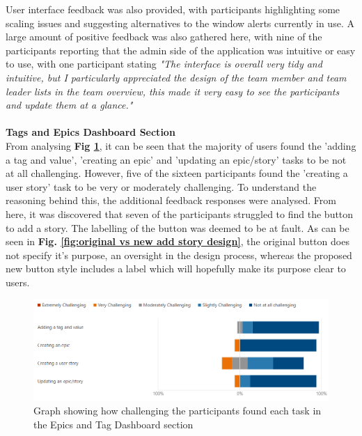 \documentclass[l4proj.tex]{subfiles}
\begin{document}
User interface feedback was also provided, with participants highlighting some scaling issues and suggesting alternatives to the window alerts currently in use. A large amount of positive feedback was also gathered here, with nine of the participants reporting that the admin side of the application was intuitive or easy to use, with one participant stating \textit{"The interface is overall very tidy and intuitive, but I particularly appreciated the design of the team member and team leader lists in the team overview, this made it very easy to see the participants and update them at a glance."} \\
\\
\textbf{Tags and Epics Dashboard Section}\\
From analysing \textbf{Fig \ref{fig:epic and tag form feedback}}, it can be seen that the majority of users found the 'adding a tag and value', 'creating an epic' and 'updating an epic/story' tasks to be not at all challenging. However, five of the sixteen participants found the 'creating a user story' task to be very or moderately challenging. To understand the reasoning behind this, the additional feedback responses were analysed. From here, it was discovered that seven of the participants struggled to find the button to add a story. The labelling of the button was deemed to be at fault. As can be seen in \textbf{Fig. \ref{fig:original vs new add story design}}, the original button does not specify it's purpose, an oversight in the design process, whereas the proposed new button style includes a label which will hopefully make its purpose clear to users. 

\begin{figure}[h!]
\begin{center}
\includegraphics[scale=0.5]{dissertation/images/EvaluationEpicsAndTagsChallengingGraph.png}
\caption{Graph showing how challenging the participants found each task in the Epics and Tag Dashboard section}
\label{fig:epic and tag form feedback} 
\end{center}
\end{figure}
\end{document}
